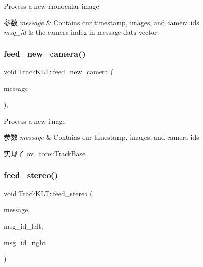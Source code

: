 Process a new monocular image 


\begin{DoxyParams}{参数}
{\em message} & Contains our timestamp, images, and camera ids \\
\hline
{\em msg\+\_\+id} & the camera index in message data vector \\
\hline
\end{DoxyParams}
\mbox{\label{classov__core_1_1TrackKLT_a8cb9c3595fbbddc9a563137cd06b07cf}} 
\subsubsection{\texorpdfstring{feed\+\_\+new\+\_\+camera()}{feed\_new\_camera()}}
{\footnotesize\ttfamily void Track\+K\+L\+T\+::feed\+\_\+new\+\_\+camera (\begin{DoxyParamCaption}\item[{const \hyperlink{structov__core_1_1CameraData}{Camera\+Data} \&}]{message }\end{DoxyParamCaption})\hspace{0.3cm}{\ttfamily [override]}, {\ttfamily [virtual]}}



Process a new image 


\begin{DoxyParams}{参数}
{\em message} & Contains our timestamp, images, and camera ids \\
\hline
\end{DoxyParams}


实现了 \hyperlink{classov__core_1_1TrackBase_a18f208f4047e9a1955406806ba68a8c1}{ov\+\_\+core\+::\+Track\+Base}.

\mbox{\label{classov__core_1_1TrackKLT_a7e0f2b1990992ed7dbd916732dd9d7a9}} 
\subsubsection{\texorpdfstring{feed\+\_\+stereo()}{feed\_stereo()}}
{\footnotesize\ttfamily void Track\+K\+L\+T\+::feed\+\_\+stereo (\begin{DoxyParamCaption}\item[{const \hyperlink{structov__core_1_1CameraData}{Camera\+Data} \&}]{message,  }\item[{size\+\_\+t}]{msg\+\_\+id\+\_\+left,  }\item[{size\+\_\+t}]{msg\+\_\+id\+\_\+right }\end{DoxyParamCaption})\hspace{0.3cm}{\ttfamily [protected]}}



